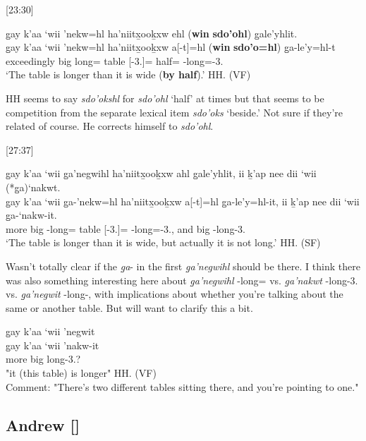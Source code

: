 [23:30]
\begin{exe}
    \ex \glll g̱ay k’aa ‘wii ’nekw=hl ha’niitx̱ooḵxw ehl (\textbf{win} \textbf{sdo’ohl}) g̱ale’yhlit. \\
    g̱ay k’aa ‘wii ’nekw=hl ha’niitx̱ooḵxw a[-t]=hl (\textbf{win} \textbf{sdo’o=hl}) g̱a-le’y=hl-t \\
    \Cntr{} exceedingly big long=\Cn{} table \Prep{}[-3.\Ii]=\Cn{} \Comp{} half=\Cn{} \Distr-long=\Cn{}-3.\Ii \\ 
    \glt `The table is longer than it is wide (\textbf{by half}).' \hfill HH.\ElicitationDate{} (VF)
\end{exe}

HH seems to say \textit{sdo'okshl} for \textit{sdo'ohl} `half' at times but that seems to be competition from the separate lexical item \textit{sdo'oks} `beside.' Not sure if they're related of course. He corrects himself to \textit{sdo'ohl}.

[27:37]
\begin{exe}
    \ex \glll
    g̱ay k’aa ‘wii g̱a’negwihl ha’niitx̱ooḵxw ahl g̱ale’yhlit, ii ḵ’ap nee dii ‘wii (*g̱a)‘nakwt. \\
    g̱ay k’aa ‘wii g̱a-’nekw=hl ha’niitx̱ooḵxw a[-t]=hl g̱a-le’y=hl-it, ii ḵ’ap nee dii ‘wii g̱a-‘nakw-it. \\
    \Cntr{} more big \Distr-long=\Cn{} table \Prep{}[-3.\Ii]=\Cn{} \Distr-long=\Cn{}-3.\Ii, and \Verum{} \Neg{} \Foc{} big \Distr-long-3.\Ii \\
    \glt `The table is longer than it is wide, but actually it is not long.'
    \hfill HH.\ElicitationDate{} (SF)
\end{exe}

Wasn't totally clear if the \textit{g̱a}- in the first \textit{g̱a’negwihl} should be there. I think there was also something interesting here about \textit{g̱a’negwihl} \Distr-long=\Cn{}  vs. \textit{g̱a’nakwt} \Distr-long-3.\Ii{} vs. \textit{g̱a’negwit} \Distr-long-\Sx{}, with implications about whether you're talking about the same or another table. But will want to clarify this a bit. 

\begin{exe}
    \ex \glll
    g̱ay k’aa ‘wii ’negwit \\
    g̱ay k’aa ‘wii ’nakw-it \\
    \Cntr{} more big long-3.\Sx? \\
    \glt "it (this table) is longer" \hfill HH.\ElicitationDate{} (VF) \\
    Comment: "There's two different tables sitting there, and you're pointing to one."
\end{exe}


\subsection{Andrew []}